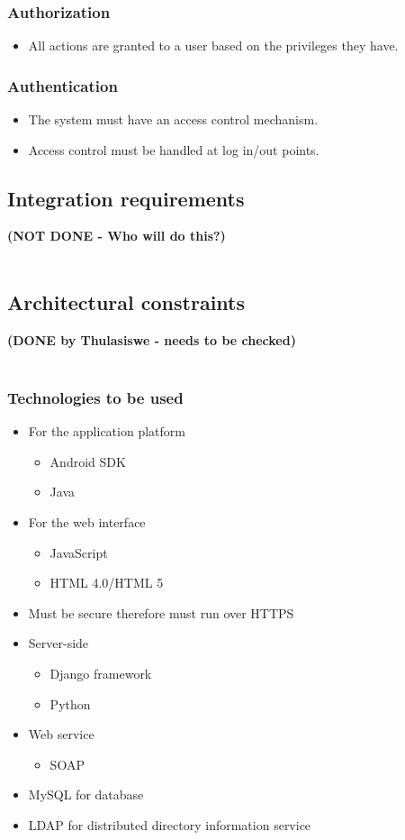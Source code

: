 \documentclass[11pt,a4paper]{article}
\begin{document}
	\subsubsection{Authorization}
	\begin{itemize}
	\item All actions are granted to a user based on the privileges they have.
	\end{itemize}

	\subsubsection{Authentication}
	\begin{itemize}
	\item The system must have an access control mechanism.
	\item Access control must be handled at log in/out points.
	\end{itemize}


\subsection{Integration requirements}
\textbf{(NOT DONE - Who will do this?)}\\ \\
\subsection{Architectural constraints}
\textbf{(DONE by Thulasiswe - needs to be checked)}\\ \\
\subsubsection{Technologies to be used}
	\begin{itemize}
	\item For the application platform
	\begin{itemize}
	\item Android SDK
	\item Java
	\end{itemize}
	\item For the web interface
	\begin{itemize}
	\item JavaScript
	\item HTML 4.0/HTML 5
	\end{itemize}
	\item Must be secure therefore must run over HTTPS
	\item Server-side
	\begin{itemize}
	\item Django framework
	\item Python
	\end{itemize}
	\item Web service
	\begin{itemize}
	\item SOAP
	\end{itemize}
	\item MySQL for database
	\item LDAP for distributed directory information service
	\end{itemize}
\end{document}
